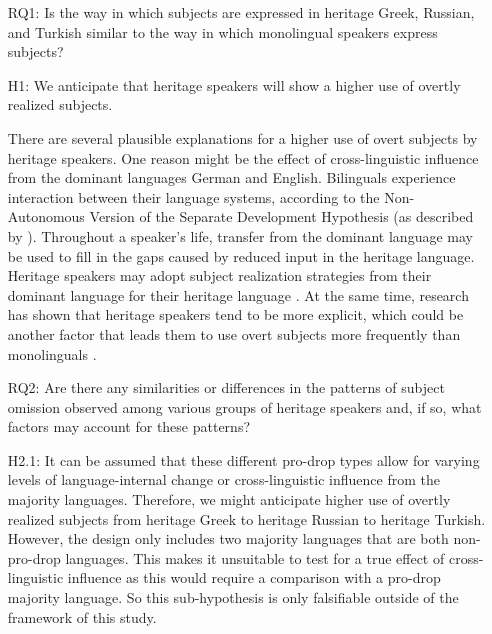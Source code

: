 \documentclass[output=paper,colorlinks,citecolor=brown]{langscibook}
\begin{document}
\begin{enumerate}
\item[RQ1:] Is the way in which subjects are expressed in heritage Greek, Russian, and Turkish  similar to the way in which monolingual speakers express subjects?
\item[H1:] We anticipate that heritage speakers will show a higher use of overtly realized subjects.
    
There are several plausible explanations for a higher use of overt subjects by heritage speakers. One reason might be the effect of cross-linguistic influence from the dominant languages German and English. Bilinguals experience interaction between their language systems, according to the Non-Autonomous Version of the Separate Development Hypothesis (as described by \cite{hulk2000bilingual, muller2001crosslinguistic, tracy2000language, tracy2014mehrsprachigkeit}). Throughout a speaker's life, transfer from the dominant language may be used to fill in the gaps caused by reduced input in the heritage language. Heritage speakers may adopt subject realization strategies from their dominant language for their heritage language \parencite{gawlitzek1996bilingual, dopke2000generation}. At the same time, research has shown that heritage speakers tend to be more explicit, which could be another factor that leads them to use overt subjects more frequently than monolinguals \parencite{Pashkova2020}.

    
\item[RQ2:] Are there any similarities or differences in the patterns of subject omission observed among various groups of heritage speakers and, if so, what factors may account for these patterns?
\item[H2.1:] It can be assumed that these different pro-drop types allow for varying levels of language-internal change or cross-linguistic influence from the majority languages. Therefore, we might anticipate higher use of overtly realized subjects from heritage Greek to heritage Russian to heritage Turkish. However, the design only includes two majority languages that are both non-pro-drop languages. This makes it unsuitable to test for a true effect of cross-linguistic influence as this would require a comparison with a pro-drop majority language. So this sub-hypothesis is only falsifiable outside of the framework of this study.
     

\end{enumerate}
\end{document}

